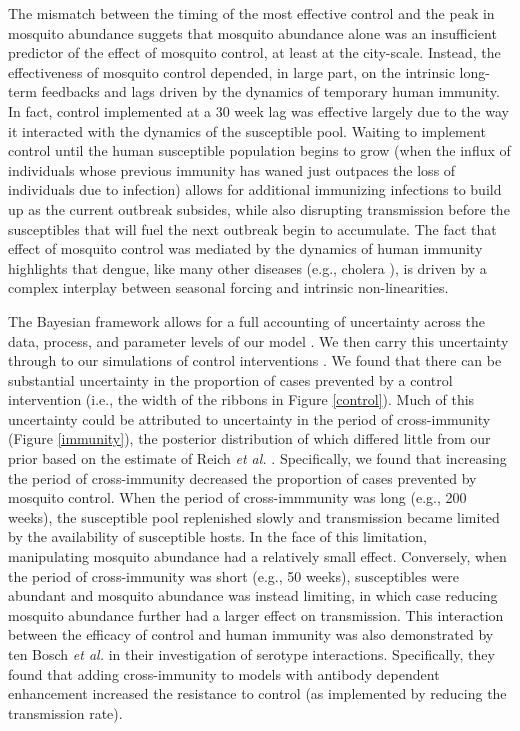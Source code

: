 \documentclass[10pt,letterpaper]{article}
\begin{document}
The mismatch between the timing of the most effective control and the peak in mosquito abundance suggets that mosquito abundance alone was an insufficient predictor of the effect of mosquito control, at least at the city-scale.
Instead, the effectiveness of mosquito control depended, in large part, on the intrinsic long-term feedbacks and lags driven by the dynamics of temporary human immunity.
In fact, control implemented at a 30 week lag was effective largely due to the way it interacted with the dynamics of the susceptible pool. 
Waiting to implement control until the human susceptible population begins to grow (when the influx of individuals whose previous immunity has waned just outpaces the loss of individuals due to infection) allows for additional immunizing infections to build up as the current outbreak subsides, while also disrupting transmission before the susceptibles that will fuel the next outbreak begin to accumulate.
The fact that effect of mosquito control was mediated by the dynamics of human immunity highlights that dengue, like many other diseases (e.g., cholera \cite{Koelle2004, Koelle2005}), is driven by a complex interplay between seasonal forcing and intrinsic non-linearities.

The Bayesian framework allows for a full accounting of uncertainty across the data, process, and parameter levels of our model \cite{Berliner1996}.
We then carry this uncertainty through to our simulations of control interventions \cite{Elderd2006}.
We found that there can be substantial uncertainty in the proportion of cases prevented by a control intervention (i.e., the width of the ribbons in Figure \ref{control}).
Much of this uncertainty could be attributed to uncertainty in the period of cross-immunity (Figure \ref{immunity}), the posterior distribution of which differed little from our prior based on the estimate of Reich \emph{et al.} \cite{Reich2013}.
Specifically, we found that increasing the period of cross-immunity decreased the proportion of cases prevented by mosquito control.
When the period of cross-immmunity was long (e.g., 200 weeks), the susceptible pool replenished slowly and transmission became limited by the availability of susceptible hosts.
In the face of this limitation, manipulating mosquito abundance had a relatively small effect.
Conversely, when the period of cross-immunity was short (e.g., 50 weeks), susceptibles were abundant and mosquito abundance was instead limiting, in which case reducing mosquito abundance further had a larger effect on transmission.
This interaction between the efficacy of control and human immunity was also demonstrated by ten Bosch \emph{et al.} \cite{TenBosch2016} in their investigation of serotype interactions.
Specifically, they found that adding cross-immunity to models with antibody dependent enhancement increased the resistance to control (as implemented by reducing the transmission rate).
\end{document}
